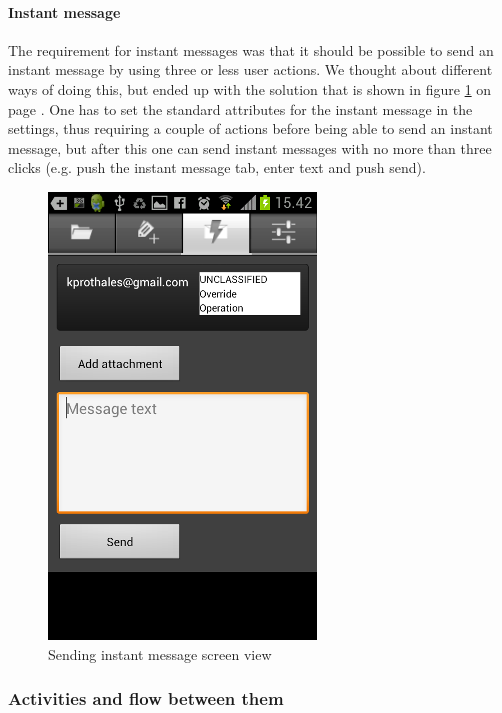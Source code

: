 \newpage

\paragraph{Instant message}\hfill
\newline
The requirement for instant messages was that it should be possible to send an instant message by using three or less user actions. We thought about different ways of doing this, but ended up with the solution that is shown in figure \ref{fig:frontend_instamessage} on page \pageref{fig:frontend_instamessage}.
One has to set the standard attributes for the instant message in the settings, thus requiring a couple of actions before being able to send an instant message, but after this one can send instant messages with no more than three clicks (e.g. push the instant message tab, enter text and push send). 

\begin{figure}[H]
\begin{center}
\includegraphics{instantmessage_final}
\end{center}
\caption{Sending instant message screen view} \label{fig:frontend_instamessage}
\end{figure}

\newpage

\subsubsection{Activities and flow between them}

